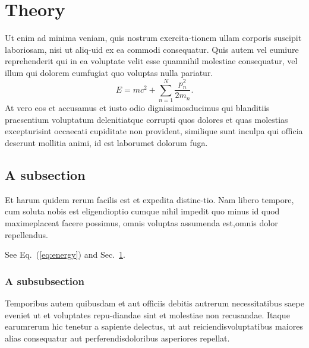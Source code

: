 \documentclass[reprint,aps,pra,superscriptaddress,10pt,nofootinbib,nobalancelastpage]{revtex4-2}
\begin{document}
\section{Theory}\label{sec:theory}
Ut enim ad minima veniam, quis nostrum exercita-\linebreak tionem ullam corporis suscipit laboriosam, nisi ut aliq-\linebreak uid ex ea commodi consequatur. Quis autem vel eum\linebreak iure reprehenderit qui in ea voluptate velit esse quam\linebreak nihil molestiae consequatur, vel illum qui dolorem eum\linebreak fugiat quo voluptas nulla pariatur.
\begin{equation}
E = m c^2 + \sum_{n=1}^{N} \frac{p_n^2}{2 m_n} .
\label{eq:energy}
\end{equation}
At vero eos et accusamus et iusto odio dignissimos\linebreak ducimus qui blanditiis praesentium voluptatum deleniti\linebreak atque corrupti quos dolores et quas molestias excepturi\linebreak sint occaecati cupiditate non provident, similique sunt in\linebreak culpa qui officia deserunt mollitia animi, id est laborum\linebreak et dolorum fuga.

\subsection{A subsection}
Et harum quidem rerum facilis est et expedita distinc-\linebreak tio. Nam libero tempore, cum soluta nobis est eligendi\linebreak optio cumque nihil impedit quo minus id quod maxime\linebreak placeat facere possimus, omnis voluptas assumenda est,\linebreak omnis dolor repellendus.

See Eq.~(\ref{eq:energy}) and Sec.~\ref{sec:theory}.

\subsubsection{A subsubsection}
Temporibus autem quibusdam et aut officiis debitis aut\linebreak rerum necessitatibus saepe eveniet ut et voluptates repu-\linebreak diandae sint et molestiae non recusandae. Itaque earum\linebreak rerum hic tenetur a sapiente delectus, ut aut reiciendis\linebreak voluptatibus maiores alias consequatur aut perferendis\linebreak doloribus asperiores repellat.
\end{document}
